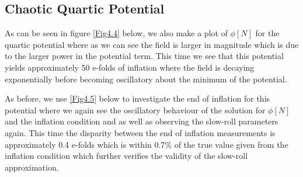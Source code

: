 \documentclass[a4paper,12pt,twoside]{report}
\begin{document}
\subsection{Chaotic Quartic Potential} \label{subsec:Res_Dyn_Quartic}

As can be seen in figure \ref{Fig4.4} below, we also make a plot of $\phi[N]$ for the quartic potential where as we can see the field is larger in magnitude which is due to the larger power in the potential term. This time we see that this potential yields approximately 50 e-folds of inflation where the field is decaying exponentially before becoming oscillatory about the minimum of the potential.

As before, we use \ref{Fig4.5} below to investigate the end of inflation for this potential where we again see the oscillatory behaviour of the solution for $\phi[N]$ and the inflation condition and as well as observing the slow-roll parameters again. This time the disparity between the end of inflation measurements is approximately 0.4 e-folds which is within 0.7\% of the true value given from the inflation condition which further verifies the validity of the slow-roll approximation.

\noindent%
\begin{minipage}{\linewidth}%
\label{Fig4.4}
\end{minipage}
\end{document}
